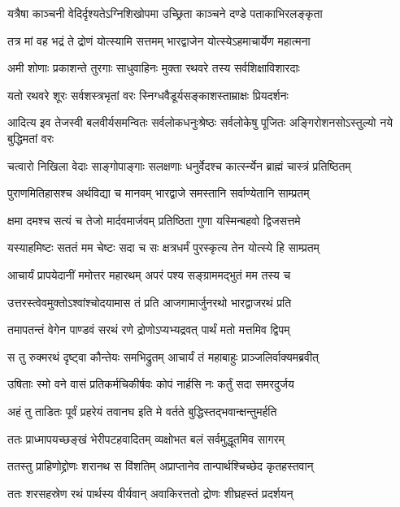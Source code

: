 \twolineshloka
{यत्रैषा काञ्चनी वेदिर्दृश्यतेऽग्निशिखोपमा}
{उच्छ्रिता काञ्चने दण्डे पताकाभिरलङ्कृता}


\twolineshloka
{तत्र मां वह भद्रं ते द्रोणं योत्स्यामि सत्तमम्}
{भारद्वाजेन योत्स्येऽहमाचार्येण महात्मना}


\twolineshloka
{अमी शोणाः प्रकाशन्ते तुरगाः साधुवाहिनः}
{मुक्ता रथवरे तस्य सर्वशिक्षाविशारदाः}


\twolineshloka
{यतो रथवरे शूरः सर्वशस्त्रभृतां वरः}
{स्निग्धवैडूर्यसङ्काशस्ताम्राक्षः प्रियदर्शनः}


\threelineshloka
{आदित्य इव तेजस्वी बलवीर्यसमन्वितः}
{सर्वलोकधनुःश्रेष्ठः सर्वलोकेषु पूजितः}
{अङ्गिरोशनसोऽस्तुल्यो नये बुद्धिमतां वरः}


\twolineshloka
{चत्वारो निखिला वेदाः साङ्गोपाङ्गाः सलक्षणाः}
{धनुर्वेदश्च कार्त्स्न्येन ब्राह्मं चास्त्रं प्रतिष्ठितम्}


\twolineshloka
{पुराणमितिहासश्च अर्थविद्या च मानवम्}
{भारद्वाजे समस्तानि सर्वाण्येतानि साम्प्रतम्}


\twolineshloka
{क्षमा दमश्च सत्यं च तेजो मार्दवमार्जवम्}
{प्रतिष्ठिता गुणा यस्मिन्बहवो द्विजसत्तमे}


\twolineshloka
{यस्याहमिष्टः सततं मम चेष्टः सदा च सः}
{क्षत्रधर्मं पुरस्कृत्य तेन योत्स्ये हि साम्प्रतम्}


\twolineshloka
{आचार्यं प्रापयेदानीं ममोत्तर महारथम्}
{अपरं पश्य सङ्ग्राममद्भुतं मम तस्य च}


\twolineshloka
{उत्तरस्त्वेवमुक्तोऽश्वांश्चोदयामास तं प्रति}
{आजगामार्जुनरथो भारद्वाजरथं प्रति}


\twolineshloka
{तमापतन्तं वेगेन पाण्डवं सरथं रणे}
{द्रोणोऽप्यभ्यद्रवत् पार्थं मतो मत्तमिव द्विपम्}


\twolineshloka
{स तु रुक्मरथं दृष्ट्वा कौन्तेयः समभिद्रुतम्}
{आचार्यं तं महाबाहुः प्राञ्जलिर्वाक्यमब्रवीत्}


\twolineshloka
{उषिताः स्मो वने वासं प्रतिकर्मचिकीर्षवः}
{कोपं नार्हसि नः कर्तुं सदा समरदुर्जय}


\twolineshloka
{अहं तु ताडितः पूर्वं प्रहरेयं तवानघ}
{इति मे वर्तते बुद्धिस्तद्भवान्क्षन्तुमर्हति}


\twolineshloka
{ततः प्राध्मापयच्छङ्खं भेरीपटहवादितम्}
{व्यक्षोभत बलं सर्वमुद्धूतमिव सागरम्}



\twolineshloka
{ततस्तु प्राहिणोद्द्रोणः शरानथ स विंशतिम्}
{अप्राप्तानेव तान्पार्थश्चिच्छेद कृतहस्तवान्}


\twolineshloka
{ततः शरसहस्रेण रथं पार्थस्य वीर्यवान्}
{अवाकिरत्ततो द्रोणः शीघ्रहस्तं प्रदर्शयन्}



